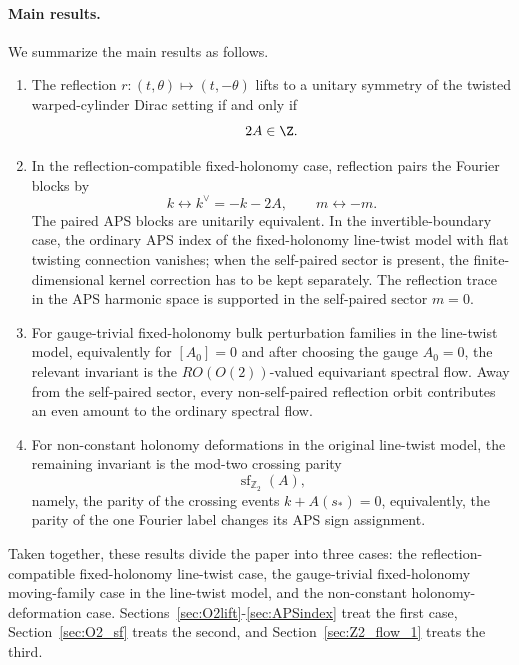\documentclass[11pt]{article}
\theoremstyle{definition}
\numberwithin{equation}{section}
\begin{document}
\paragraph{Main results.}
We summarize the main results as follows.
\begin{enumerate}[label=(\roman*)]
\item The reflection \(r : (t,\theta) \mapsto (t,-\theta)\) lifts to a unitary symmetry of the twisted warped-cylinder Dirac setting if and only if
\begin{equation}
2A\in\Z.
\end{equation}

\item In the reflection-compatible fixed-holonomy case, reflection pairs the Fourier blocks by
\begin{equation}
k\leftrightarrow k^\vee=-k-2A,
\qquad
m\leftrightarrow -m.
\end{equation}
The paired APS blocks are unitarily equivalent. In the invertible-boundary case, the ordinary APS index of the fixed-holonomy line-twist model with flat twisting connection vanishes; when the self-paired sector is present, the finite-dimensional kernel correction has to be kept separately. The reflection trace in the APS harmonic space is supported in the self-paired sector \(m=0\).


\item For gauge-trivial fixed-holonomy bulk perturbation families in the line-twist model, equivalently for $[A_0]=0$ and after choosing the gauge $A_0=0$, the relevant invariant is the \(RO(O(2))\)-valued equivariant spectral flow. Away from the self-paired sector, every non-self-paired reflection orbit contributes an even amount to the ordinary spectral flow.



\item For non-constant holonomy deformations in the original line-twist model, the remaining invariant is the mod-two crossing parity
\begin{equation}
\operatorname{sf}_{\mathbb Z_2}(A),
\end{equation}
namely, the parity of the crossing events \(k+A(s_*)=0\), equivalently, the parity of the one Fourier label changes its APS sign assignment.
\end{enumerate}

Taken together, these results divide the paper into three cases: the reflection-compatible fixed-holonomy line-twist case, the gauge-trivial fixed-holonomy moving-family case in the line-twist model, and the non-constant holonomy-deformation case.  Sections~\ref{sec:O2lift}-\ref{sec:APSindex} treat the first case, Section~\ref{sec:O2_sf} treats the second, and Section~\ref{sec:Z2_flow_1} treats the third.
\end{document}
